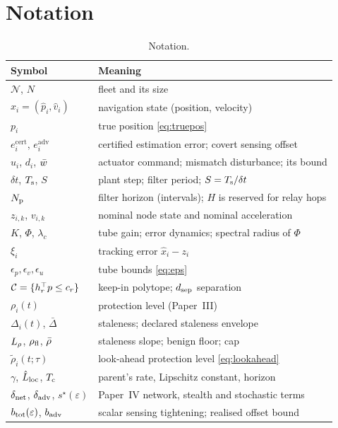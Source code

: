 \section{Notation}\label{app:notation}
\begin{table}[h]
\centering\scriptsize
\caption{Notation.}
\label{tab:notation}
\setlength{\tabcolsep}{3pt}
\begin{tabularx}{\columnwidth}{@{}l>{\raggedright\arraybackslash}X@{}}
\toprule
Symbol & Meaning \\
\midrule
$\mathcal N$, $N$ & fleet and its size\\
$\hat x_i=(\hat p_i,\hat v_i)$ & navigation state (position, velocity)\\
$p_i$ & true position \eqref{eq:truepos}\\
$e^{\mathrm{cert}}_i$, $e^{\mathrm{adv}}_i$ & certified estimation error; covert sensing offset\\
$u_i$, $d_i$, $\bar w$ & actuator command; mismatch disturbance; its bound\\
$\delta t$, $T_{\mathrm{s}}$, $S$ & plant step; filter period; $S=T_{\mathrm{s}}/\delta t$\\
$N_{\mathrm{p}}$ & filter horizon (intervals); $H$ is reserved for relay hops\\
$z_{i,k}$, $v_{i,k}$ & nominal node state and nominal acceleration\\
$K$, $\Phi$, $\lambda_c$ & tube gain; error dynamics; spectral radius of $\Phi$\\
$\xi_i$ & tracking error $\hat x_i-z_i$\\
$\epsilon_p,\epsilon_v,\epsilon_u$ & tube bounds \eqref{eq:eps}\\
$\mathcal{C}=\{h_r^\top p\le c_r\}$ & keep-in polytope; $d_{\mathrm{sep}}$ separation\\
$\rho_i(t)$ & protection level (Paper~III)\\
$\Delta_i(t)$, $\bar\Delta$ & staleness; declared staleness envelope\\
$L_{\rho}$, $\rho_{\mathrm{fl}}$, $\bar\rho$ & staleness slope; benign floor; cap\\
$\tilde\rho_i(t;\tau)$ & look-ahead protection level \eqref{eq:lookahead}\\
$\gamma$, $\hat L_{\mathrm{loc}}$, $T_{\mathrm{c}}$ & parent's rate, Lipschitz constant, horizon\\
$\delta_{\mathrm{net}}$, $\delta_{\mathrm{adv}}$, $s^\star(\varepsilon)$ & Paper~IV network, stealth and stochastic terms\\
$b_{\mathrm{tot}}(\varepsilon)$, $b_{\mathrm{adv}}$ & scalar sensing tightening; realised offset bound\\

\end{tabularx}
\end{table}

